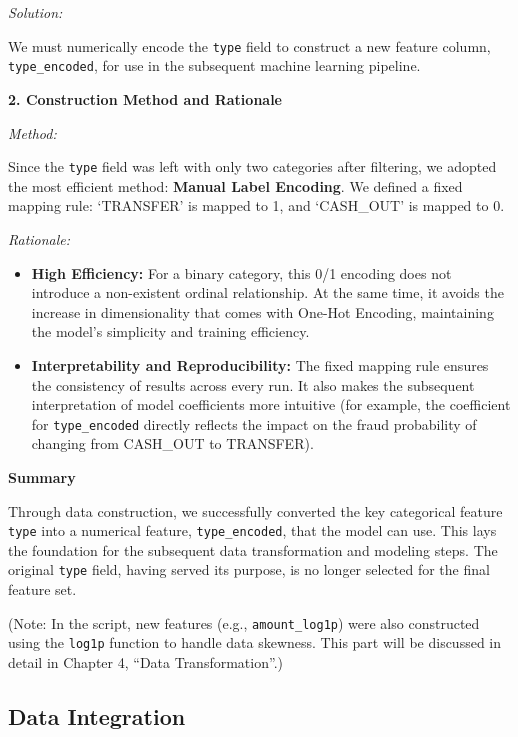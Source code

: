 \documentclass[sigplan,screen]{acmart}
\begin{document}
\textit{Solution:}

We must numerically encode the \texttt{type} field to construct a new feature column, \texttt{type\_encoded}, for use in the subsequent machine learning pipeline.

\textbf{2. Construction Method and Rationale}

\textit{Method:}

Since the \texttt{type} field was left with only two categories after filtering, we adopted the most efficient method: \textbf{Manual Label Encoding}. We defined a fixed mapping rule: `TRANSFER' is mapped to 1, and `CASH\_OUT' is mapped to 0.

\textit{Rationale:}

\begin{itemize}
\item \textbf{High Efficiency:} For a binary category, this 0/1 encoding does not introduce a non-existent ordinal relationship. At the same time, it avoids the increase in dimensionality that comes with One-Hot Encoding, maintaining the model's simplicity and training efficiency.
\item \textbf{Interpretability and Reproducibility:} The fixed mapping rule ensures the consistency of results across every run. It also makes the subsequent interpretation of model coefficients more intuitive (for example, the coefficient for \texttt{type\_encoded} directly reflects the impact on the fraud probability of changing from CASH\_OUT to TRANSFER).
\end{itemize}

\textbf{Summary}

Through data construction, we successfully converted the key categorical feature \texttt{type} into a numerical feature,\newline
\texttt{type\_encoded}, that the model can use. This lays the foundation for the subsequent data transformation and modeling steps. The original \texttt{type} field, having served its purpose, is no longer selected for the final feature set.

(Note: In the script, new features (e.g., \texttt{amount\_log1p}) were also constructed using the \texttt{log1p} function to handle data skewness. This part will be discussed in detail in Chapter 4, ``Data Transformation''.)

\subsection{Data Integration}
\end{document}
